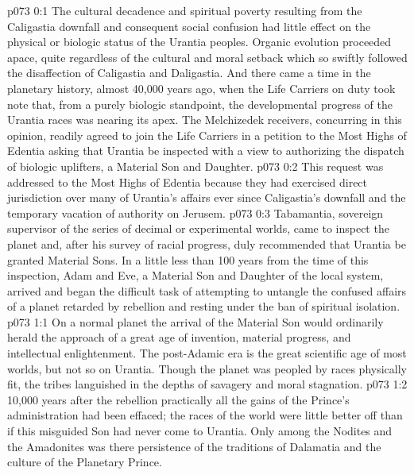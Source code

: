 \author{Solonia}
\vs p073 0:1 The cultural decadence and spiritual poverty resulting from the Caligastia downfall and consequent social confusion had little effect on the physical or biologic status of the Urantia peoples. Organic evolution proceeded apace, quite regardless of the cultural and moral setback which so swiftly followed the disaffection of Caligastia and Daligastia. And there came a time in the planetary history, almost 40,000 years ago, when the Life Carriers on duty took note that, from a purely biologic standpoint, the developmental progress of the Urantia races was nearing its apex. The Melchizedek receivers, concurring in this opinion, readily agreed to join the Life Carriers in a petition to the Most Highs of Edentia asking that Urantia be inspected with a view to authorizing the dispatch of biologic uplifters, a Material Son and Daughter.
\vs p073 0:2 This request was addressed to the Most Highs of Edentia because they had exercised direct jurisdiction over many of Urantia’s affairs ever since Caligastia’s downfall and the temporary vacation of authority on Jerusem.
\vs p073 0:3 Tabamantia, sovereign supervisor of the series of decimal or experimental worlds, came to inspect the planet and, after his survey of racial progress, duly recommended that Urantia be granted Material Sons. In a little less than 100 years from the time of this inspection, Adam and Eve, a Material Son and Daughter of the local system, arrived and began the difficult task of attempting to untangle the confused affairs of a planet retarded by rebellion and resting under the ban of spiritual isolation.
\vs p073 1:1 On a normal planet the arrival of the Material Son would ordinarily herald the approach of a great age of invention, material progress, and intellectual enlightenment. The post\hyp{}Adamic era is the great scientific age of most worlds, but not so on Urantia. Though the planet was peopled by races physically fit, the tribes languished in the depths of savagery and moral stagnation.
\vs p073 1:2 10,000 years after the rebellion practically all the gains of the Prince’s administration had been effaced; the races of the world were little better off than if this misguided Son had never come to Urantia. Only among the Nodites and the Amadonites was there persistence of the traditions of Dalamatia and the culture of the Planetary Prince.
